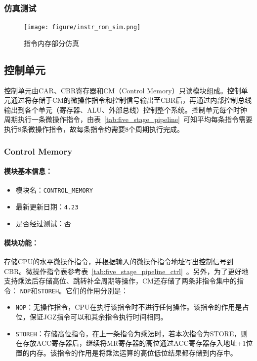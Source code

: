 \documentclass[lang=cn,a4paper,newtx]{elegantpaper}
\begin{document}
\subsubsection{仿真测试}
\begin{figure}[htbp]
  \centering
  \texttt{[image: figure/instr\_rom\_sim.png]}
  \caption{指令内存部分仿真}
\end{figure}


\subsection{控制单元}
控制单元由CAR、CBR寄存器和CM（Control Memory）只读模块组成。控制单元通过将存储于CM的微操作指令和控制信号输出至CBR后，再通过内部控制总线输出到各个单元（寄存器、ALU、外部总线）控制整个系统。控制单元每个时钟周期执行一条微操作指令，由表~\ref{tab:five_stage_pipeline}~可知平均每条指令需要执行8条微操作指令，故每条指令约需要8个周期执行完成。
\subsubsection{Control Memory}
\paragraph{模块基本信息：}
\begin{itemize}
  \item 模块名：\texttt{CONTROL\_MEMORY}
  \item 最新更新日期：\texttt{4.23}
  \item 是否经过测试：否
\end{itemize}
\paragraph{模块功能：}
存储CPU的水平微操作指令，并根据输入的微操作指令地址写出控制信号到CBR。微操作指令表参考表~\ref{tab:five_stage_pipeline_ctrl}~。另外，为了更好地支持乘法后存储高位、跳转补全周期等操作，CM还存储了两条非指令集中的指令：
\texttt{NOP}和\texttt{STOREH}。它们的作用分别是：
\begin{itemize}
  \item \texttt{NOP}：无操作指令，CPU在执行该指令时不进行任何操作。该指令的作用是占位，保证JGZ指令可以和其余指令执行时间相同。
  \item \texttt{STOREH}：存储高位指令，在上一条指令为乘法时，若本次指令为STORE，则在存放ACC寄存器后，继续将MR寄存器的高位通过ACC寄存器存入地址+1位置的内存。该指令的作用是将乘法运算的高位低位结果都存储到内存中。
\end{itemize}
\end{document}
